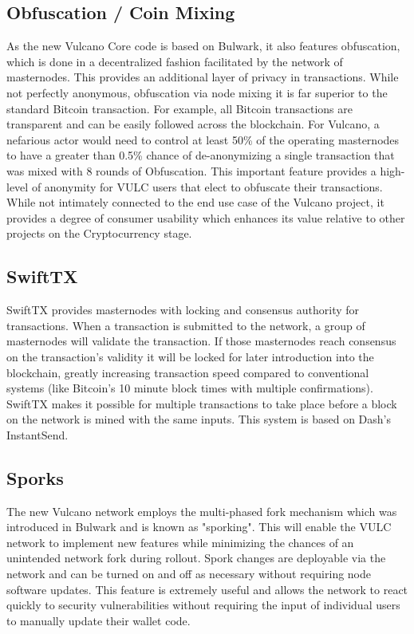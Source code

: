 \documentclass[A4paper, 12pt]{article}
\begin{document}
\subsection{Obfuscation / Coin Mixing}
As the new Vulcano Core code is based on Bulwark, it also features obfuscation, which is done in a decentralized fashion facilitated by the network of masternodes. This provides an additional layer of privacy in transactions. While not perfectly anonymous, obfuscation via node mixing it is far superior to the standard Bitcoin transaction. For example, all Bitcoin transactions are transparent and can be easily followed across the blockchain. For Vulcano, a nefarious actor would need to control at least 50\% of the operating masternodes to have a greater than 0.5\% chance of de-anonymizing a single transaction that was mixed with 8 rounds of Obfuscation. This important feature provides a high-level of anonymity for VULC users that elect to obfuscate their transactions. While not intimately connected to the end use case of the Vulcano project, it provides a degree of consumer usability which enhances its value relative to other projects on the Cryptocurrency stage.

\subsection{SwiftTX}
SwiftTX provides masternodes with locking and consensus authority for transactions. When a transaction is submitted to the network, a group of masternodes will validate the transaction. If those masternodes reach consensus on the transaction’s validity it will be locked for later introduction into the blockchain, greatly increasing transaction speed compared to conventional systems (like Bitcoin’s 10 minute block times with multiple confirmations). SwiftTX makes it possible for multiple transactions to take place before a block on the network is mined with the same inputs. This system is based on Dash’s InstantSend.

\subsection{Sporks}
The new Vulcano network employs the multi-phased fork mechanism which was introduced in Bulwark and is known as "sporking". This will enable the VULC network to implement new features while minimizing the chances of an unintended network fork during rollout. Spork changes are deployable via the network and can be turned on and off as necessary without requiring node software updates. This feature is extremely useful and allows the network to react quickly to security vulnerabilities without requiring the input of individual users to manually update their wallet code.
\end{document}
